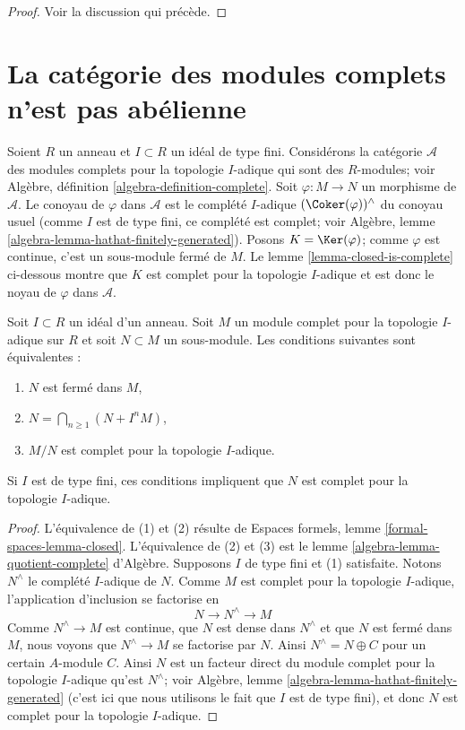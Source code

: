 \begin{proof}
Voir la discussion qui précède.
\end{proof}



\section{La catégorie des modules complets n'est pas abélienne}
\label{section-non-abelian}

\noindent
Soient $R$ un anneau et $I \subset R$ un idéal de type fini.
Considérons la catégorie $\mathcal{A}$ des modules complets pour la topologie $I$-adique
qui sont des $R$-modules; voir
Algèbre, définition \ref{algebra-definition-complete}.
Soit $\varphi : M \to N$ un morphisme de $\mathcal{A}$.
Le conoyau de $\varphi$ dans $\mathcal{A}$ est le complété $I$-adique
$(\Coker(\varphi))^\wedge$ du conoyau usuel
(comme $I$ est de type fini, ce complété est complet; voir
Algèbre, lemme \ref{algebra-lemma-hathat-finitely-generated}).
Posons $K = \Ker(\varphi)$; comme $\varphi$ est continue, c'est
un sous-module fermé de $M$. Le lemme \ref{lemma-closed-is-complete}
ci-dessous montre que $K$ est complet pour la topologie $I$-adique et est donc le
noyau de $\varphi$ dans $\mathcal{A}$.

\begin{lemma}
\label{lemma-closed-is-complete}
Soit $I \subset R$ un idéal d'un anneau. Soit $M$ un module complet
pour la topologie $I$-adique sur $R$ et soit $N \subset M$ un sous-module. Les conditions suivantes sont équivalentes :
\begin{enumerate}
\item $N$ est fermé dans $M$,
\item $N = \bigcap_{n \geq 1} (N + I^n M)$,
\item $M/N$ est complet pour la topologie $I$-adique.
\end{enumerate}
Si $I$ est de type fini, ces conditions impliquent que $N$
est complet pour la topologie $I$-adique.
\end{lemma}

\begin{proof}
L'équivalence de (1) et (2) résulte de
Espaces formels, lemme \ref{formal-spaces-lemma-closed}.
L'équivalence de (2) et (3) est le
lemme \ref{algebra-lemma-quotient-complete} d'Algèbre.
Supposons $I$ de type fini et (1) satisfaite.
Notons $N^\wedge$ le complété $I$-adique de $N$. Comme $M$
est complet pour la topologie $I$-adique, l'application d'inclusion se factorise en
$$
N \to N^\wedge \to M
$$
Comme $N^\wedge \to M$ est continue, que $N$ est dense dans $N^\wedge$
et que $N$ est fermé dans $M$, nous voyons que
$N^\wedge \to M$ se factorise par $N$. Ainsi $N^\wedge = N \oplus C$
pour un certain $A$-module $C$. Ainsi $N$ est un facteur direct du
module complet pour la topologie $I$-adique qu'est $N^\wedge$; voir
Algèbre, lemme \ref{algebra-lemma-hathat-finitely-generated}
(c'est ici que nous utilisons le fait que $I$ est de type fini),
et donc $N$ est complet pour la topologie $I$-adique.
\end{proof}

